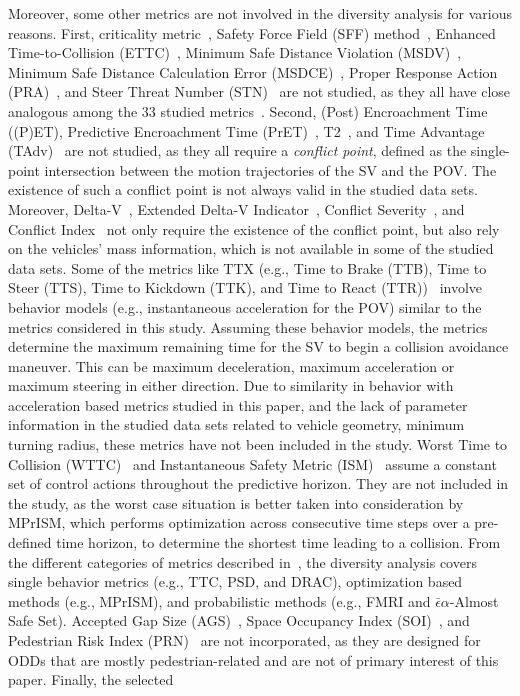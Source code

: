 \documentclass[journal]{IEEEtran}
\begin{document}
Moreover, some other metrics are not involved in the diversity analysis for various reasons. First, criticality metric~\cite{junietz2018criticality}, Safety Force Field (SFF) method~\cite{nvidia2019}, Enhanced Time-to-Collision (ETTC)~\cite{feng2020testing, chen2016comparison}, Minimum Safe Distance Violation (MSDV)~\cite{wishart2020driving}, Minimum Safe Distance Calculation Error (MSDCE)~\cite{wishart2020driving}, Proper Response Action (PRA)~\cite{wishart2020driving}, and Steer Threat Number (STN)~\cite{Jansson2005CollisionAT, eidehall2011multi} are not studied, as they all have close analogous among the 33 studied metrics~\cite{suk2022rationale}. Second, (Post) Encroachment Time~\cite{allen1978analysis} ((P)ET), Predictive Encroachment Time (PrET)~\cite{allen1978analysis}, T2~\cite{laureshyn2010evaluation}, and Time Advantage (TAdv)~\cite{hansson1975studies} are not studied, as they all require a \emph{conflict point}, defined as the single-point intersection between the motion trajectories of the SV and the POV. The existence of such a conflict point is not always valid in the studied data sets. Moreover, Delta-V~\cite{shelby2011delta}, Extended Delta-V Indicator~\cite{laureshyn2010evaluation}, Conflict Severity~\cite{bagdadi2013estimation}, and Conflict Index~\cite{alhajyaseen2015integration} not only require the existence of the conflict point, but also rely on the vehicles' mass information, which is not available in some of the studied data sets. Some of the metrics like TTX (e.g., Time to Brake (TTB), Time to Steer (TTS), Time to Kickdown (TTK), and Time to React (TTR))~\cite{hillenbrand2006multilevel, tamke2011flexible} involve behavior models (e.g., instantaneous acceleration for the POV) similar to the metrics considered in this study. Assuming these behavior models, the metrics determine the maximum remaining time for the SV to begin a collision avoidance maneuver. This can be maximum deceleration, maximum acceleration or maximum steering in either direction. Due to similarity in behavior with acceleration based metrics studied in this paper, and the lack of parameter information in the studied data sets related to vehicle geometry, minimum turning radius, these metrics have not been included in the study. Worst Time to Collision (WTTC)~\cite{wachenfeld2016worst} and Instantaneous Safety Metric (ISM)~\cite{barickman2019instantaneous} assume a constant set of control actions throughout the predictive horizon. They are not included in the study, as the worst case situation is better taken into consideration by MPrISM, which performs optimization across consecutive time steps over a pre-defined time horizon, to determine the shortest time leading to a collision. From the different categories of metrics described in~\cite{dahl2018collision}, the diversity analysis covers single behavior metrics (e.g., TTC, PSD, and DRAC), optimization based methods (e.g., MPrISM), and probabilistic methods (e.g., FMRI and $\bar{\epsilon}\alpha$-Almost Safe Set). Accepted Gap Size (AGS)~\cite{petzoldt2014relationship}, Space Occupancy Index (SOI)~\cite{ogawa2007analysis}, and Pedestrian Risk Index (PRN)~\cite{cafiso2011crosswalk} are not incorporated, as they are designed for ODDs that are mostly pedestrian-related and are not of primary interest of this paper. Finally, the selected 
\end{document}
